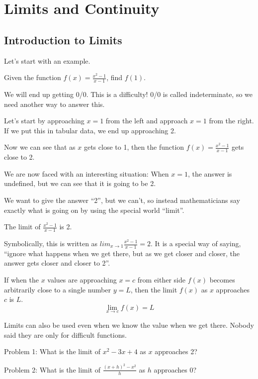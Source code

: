 \documentclass[../abcalc.tex]{subfiles}
\begin{document}
\chapter{Limits and Continuity}
\section{Introduction to Limits}
Let's start with an example.

Given the function $f(x)=\frac{x^2-1}{x-1}$, find $f(1)$.

We will end up getting 0/0. This is a difficulty! 0/0 is called indeterminate, so we need another way to answer this.

Let's start by approaching $x=1$ from the left and approach $x=1$ from the right. If we put this in tabular data, we end up approaching 2.

Now we can see that as $x$ gets close to 1, then the function $f(x)=\frac{x^2-1}{x-1}$ gets close to 2.

We are now faced with an interesting situation: When $x=1$, the answer is undefined, but we can see that it is going to be 2.

We want to give the answer ``2'', but we can't, so instead mathematicians say exactly what is going on by using the special world ``limit''.
\begin{center}
    The limit of $\frac{x^2-1}{x-1}$ is 2.
\end{center}

Symbolically, this is written as $lim_{x\to 1}\frac{x^2-1}{x-1}=2$. It is a special way of saying, ``ignore what happens when we get there, but as we get closer and closer, the answer gets closer and closer to 2''.

\begin{definition}
    If when the $x$ values are approaching $x=c$ from either side $f(x)$ becomes arbitrarily close to a single number $y=L$, then the limit $f(x)$ as $x$ approaches $c$ is $L$.
    \[\lim_{x\to c} f(x) = L\]
\end{definition}

Limits can also be used even when we know the value when we get there. Nobody said they are only for difficult functions.

Problem 1: What is the limit of $x^2-3x+4$ as $x$ approaches 2?

Problem 2: What is the limit of $\frac{(x+h)^2-x^2}{h}$ as $h$ approaches 0?
\end{document}
